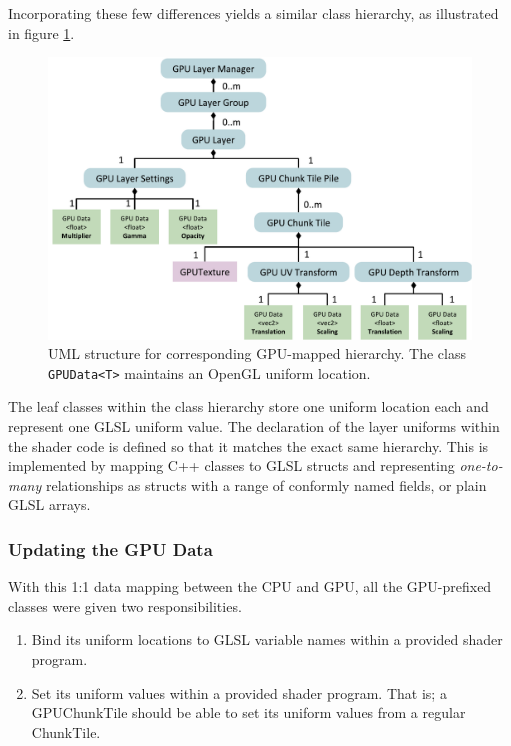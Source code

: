 Incorporating these few differences yields a similar class hierarchy, as illustrated in figure \ref{fig:gpulayermanager}. 

\begin{figure}[htbp]
    \centering
    \includegraphics[width=\textwidth]{figures/implementation/layers/gpulayermanager.pdf}
    \caption{UML structure for corresponding GPU-mapped hierarchy. The class \texttt{GPUData<T>} maintains an OpenGL uniform location.}
    \label{fig:gpulayermanager}
\end{figure}

The leaf classes within the class hierarchy store one uniform location each and represent one GLSL uniform value. The declaration of the layer uniforms within the shader code is defined so that it matches the exact same hierarchy. This is implemented by mapping C++ classes to GLSL structs and representing \emph{one-to-many} relationships as structs with a range of conformly named fields, or plain GLSL arrays.

\subsubsection{Updating the GPU Data}

With this 1:1 data mapping between the CPU and GPU, all the GPU-prefixed classes were given two responsibilities.

\begin{enumerate}
\item Bind its uniform locations to GLSL variable names within a provided shader program.
\item Set its uniform values within a provided shader program. That is; a GPUChunkTile should be able to set its uniform values from a regular ChunkTile.
\end{enumerate}

